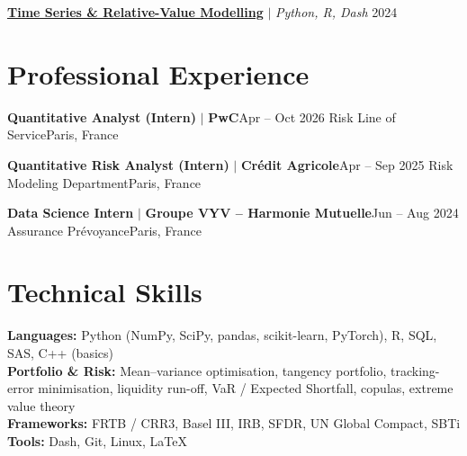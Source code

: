   \resumeProjectHeading
    {\href{https://usenamefd.github.io/projects/econometrie-financiere-vecm.html}{\textbf{Time Series \& Relative-Value Modelling}} $|$ \emph{Python, R, Dash}} {2024}
    \resumeItemListStart
    \resumeItemListEnd

\resumeSubHeadingListEnd

\section{Professional Experience}
\resumeSubHeadingListStart
  \resumeSubheading
    {\textbf{Quantitative Analyst (Intern)} $|$ \textbf{PwC}}{Apr -- Oct 2026}
    {Risk Line of Service}{Paris, France}
    \resumeItemListStart
    \resumeItemListEnd

  \resumeSubheading
    {\textbf{Quantitative Risk Analyst (Intern)} $|$ \textbf{Cr\'edit Agricole}}{Apr -- Sep 2025}
    {Risk Modeling Department}{Paris, France}
    \resumeItemListStart
    \resumeItemListEnd

  \resumeSubheading
    {\textbf{Data Science Intern} $|$ \textbf{Groupe VYV -- Harmonie Mutuelle}}{Jun -- Aug 2024}
    {Assurance Pr\'evoyance}{Paris, France}
    \resumeItemListStart
    \resumeItemListEnd
\resumeSubHeadingListEnd

\section{Technical Skills}
\begin{itemize}[leftmargin=0.15in, label={}]
  \small{\item{
    \textbf{Languages:} Python (NumPy, SciPy, pandas, scikit-learn, PyTorch), R, SQL, SAS, C++ (basics) \\
    \textbf{Portfolio \& Risk:} Mean--variance optimisation, tangency portfolio, tracking-error minimisation, liquidity run-off, VaR / Expected Shortfall, copulas, extreme value theory \\
    \textbf{Frameworks:} FRTB / CRR3, Basel III, IRB, SFDR, UN Global Compact, SBTi \\
    \textbf{Tools:} Dash, Git, Linux, \LaTeX
  }}
\end{itemize}

